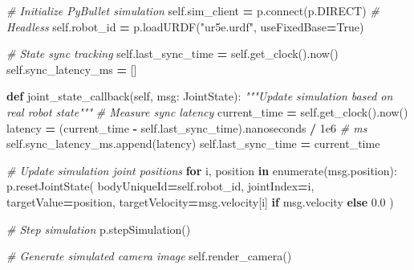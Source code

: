 \documentclass[
]{article}
\newenvironment{Shaded}{\begin{snugshade}}{\end{snugshade}}
\newcommand{\BuiltInTok}[1]{#1}
\newcommand{\CommentTok}[1]{\textcolor[rgb]{0.56,0.35,0.01}{\textit{#1}}}
\newcommand{\ControlFlowTok}[1]{\textcolor[rgb]{0.13,0.29,0.53}{\textbf{#1}}}
\newcommand{\ExtensionTok}[1]{#1}
\newcommand{\FloatTok}[1]{\textcolor[rgb]{0.00,0.00,0.81}{#1}}
\newcommand{\KeywordTok}[1]{\textcolor[rgb]{0.13,0.29,0.53}{\textbf{#1}}}
\newcommand{\NormalTok}[1]{#1}
\newcommand{\OperatorTok}[1]{\textcolor[rgb]{0.81,0.36,0.00}{\textbf{#1}}}
\newcommand{\StringTok}[1]{\textcolor[rgb]{0.31,0.60,0.02}{#1}}
\newcommand{\VariableTok}[1]{\textcolor[rgb]{0.00,0.00,0.00}{#1}}
\begin{document}
\begin{Shaded}
\begin{Highlighting}[]
        \CommentTok{\# Initialize PyBullet simulation}
        \VariableTok{self}\NormalTok{.sim\_client }\OperatorTok{=}\NormalTok{ p.}\ExtensionTok{connect}\NormalTok{(p.DIRECT)  }\CommentTok{\# Headless}
        \VariableTok{self}\NormalTok{.robot\_id }\OperatorTok{=}\NormalTok{ p.loadURDF(}\StringTok{"ur5e.urdf"}\NormalTok{, useFixedBase}\OperatorTok{=}\VariableTok{True}\NormalTok{)}

        \CommentTok{\# State sync tracking}
        \VariableTok{self}\NormalTok{.last\_sync\_time }\OperatorTok{=} \VariableTok{self}\NormalTok{.get\_clock().now()}
        \VariableTok{self}\NormalTok{.sync\_latency\_ms }\OperatorTok{=}\NormalTok{ []}

    \KeywordTok{def}\NormalTok{ joint\_state\_callback(}\VariableTok{self}\NormalTok{, msg: JointState):}
        \CommentTok{"""Update simulation based on real robot state"""}
        \CommentTok{\# Measure sync latency}
\NormalTok{        current\_time }\OperatorTok{=} \VariableTok{self}\NormalTok{.get\_clock().now()}
\NormalTok{        latency }\OperatorTok{=}\NormalTok{ (current\_time }\OperatorTok{{-}} \VariableTok{self}\NormalTok{.last\_sync\_time).nanoseconds }\OperatorTok{/} \FloatTok{1e6}  \CommentTok{\# ms}
        \VariableTok{self}\NormalTok{.sync\_latency\_ms.append(latency)}
        \VariableTok{self}\NormalTok{.last\_sync\_time }\OperatorTok{=}\NormalTok{ current\_time}

        \CommentTok{\# Update simulation joint positions}
        \ControlFlowTok{for}\NormalTok{ i, position }\KeywordTok{in} \BuiltInTok{enumerate}\NormalTok{(msg.position):}
\NormalTok{            p.resetJointState(}
\NormalTok{                bodyUniqueId}\OperatorTok{=}\VariableTok{self}\NormalTok{.robot\_id,}
\NormalTok{                jointIndex}\OperatorTok{=}\NormalTok{i,}
\NormalTok{                targetValue}\OperatorTok{=}\NormalTok{position,}
\NormalTok{                targetVelocity}\OperatorTok{=}\NormalTok{msg.velocity[i] }\ControlFlowTok{if}\NormalTok{ msg.velocity }\ControlFlowTok{else} \FloatTok{0.0}
\NormalTok{            )}

        \CommentTok{\# Step simulation}
\NormalTok{        p.stepSimulation()}

        \CommentTok{\# Generate simulated camera image}
        \VariableTok{self}\NormalTok{.render\_camera()}


\end{Highlighting}
\end{Shaded}
\end{document}

